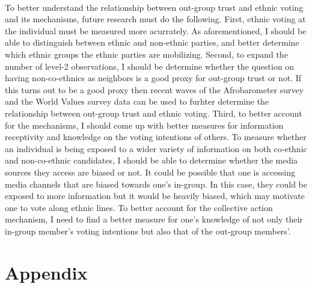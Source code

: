 \documentclass[a4paper, 12pt]{article}
\begin{document}
\paragraph{}
To better understand the relationship between out-group trust and ethnic voting and its mechanisms, future research must do the following. First, ethnic voting at the individual must be measured more acurrately. As aforementioned, I should be able to distinguish between ethnic and non-ethnic parties, and better determine which ethnic groups the ethnic parties are mobilizing. Second, to expand the number of level-2 observations, I should be determine whether the question on having non-co-ethnics as neighbors is a good proxy for out-group trust or not. If this turns out to be a good proxy then recent waves of the Afrobarometer survey and the World Values survey data can be used to furhter determine the relationship between out-group trust and ethnic voting. Third, to better account for the mechanisms, I should come up with better measures for information receptivity and knowledge on the voting intentions of others. To measure whether an individual is being exposed to a wider variety of information on both co-ethnic and non-co-ethnic candidates, I should be able to determine whether the media sources they access are biased or not. It could be possible that one is accessing media channels that are biased towards one's in-group. In this case, they could be exposed to more information but it would be heavily biased, which may motivate one to vote along ethnic lines. To better account for the collective action mechanism, I need to find a better measure for one's knowledge of not only their in-group member's voting intentions but also that of the out-group members'.  

\pagebreak
\section{Appendix}
\end{document}

